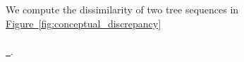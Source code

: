 \documentclass[10pt,twoside,lineno]{gsajnl}
\newcommand{\R}{\mathbb{R}}
\newcommand{\T}{\mathbb{T}}
\newcommand{\comment}[1]{{\color{violet} \it #1}}
\newcommand{\algorithmref}[2][]{%
	\hyperref[{#2}]{%
		Algorithm~\ref*{#2}%
		\ifx\\#1\\%
		\else
		\,#1%
		\fi
	}%
}
\newcommand*{\figref}[2][]{%
	\hyperref[{#2}]{%
		Figure~\ref*{#2}%
		\ifx\\#1\\%
		\else
		\,#1%
		\fi
	}%
}
\begin{document}
We compute the dissimilarity of two tree sequences in \figref{fig:conceptual_discrepancy}.


%
%
%
% 
\end{document}

